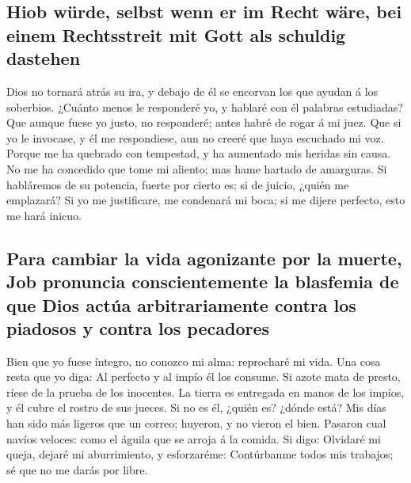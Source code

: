 \hypertarget{hiob-wuxfcrde-selbst-wenn-er-im-recht-wuxe4re-bei-einem-rechtsstreit-mit-gott-als-schuldig-dastehen}{%
\subsection{Hiob würde, selbst wenn er im Recht wäre, bei einem
Rechtsstreit mit Gott als schuldig
dastehen}\label{hiob-wuxfcrde-selbst-wenn-er-im-recht-wuxe4re-bei-einem-rechtsstreit-mit-gott-als-schuldig-dastehen}}

 Dios no tornará atrás su ira, y debajo de él se encorvan
los que ayudan á los soberbios.  ¿Cuánto menos le
responderé yo, y hablaré con él palabras estudiadas?  Que
aunque fuese yo justo, no responderé; antes habré de rogar á mi juez.
 Que si yo le invocase, y él me respondiese, aun no
creeré que haya escuchado mi voz.  Porque me ha quebrado
con tempestad, y ha aumentado mis heridas sin causa.  No
me ha concedido que tome mi aliento; mas hame hartado de amarguras.
 Si habláremos de su potencia, fuerte por cierto es; si
de juicio, ¿quién me emplazará?  Si yo me justificare, me
condenará mi boca; si me dijere perfecto, esto me hará inicuo.

\hypertarget{para-cambiar-la-vida-agonizante-por-la-muerte-job-pronuncia-conscientemente-la-blasfemia-de-que-dios-actuxfaa-arbitrariamente-contra-los-piadosos-y-contra-los-pecadores}{%
\subsection{Para cambiar la vida agonizante por la muerte, Job pronuncia
conscientemente la blasfemia de que Dios actúa arbitrariamente contra
los piadosos y contra los
pecadores}\label{para-cambiar-la-vida-agonizante-por-la-muerte-job-pronuncia-conscientemente-la-blasfemia-de-que-dios-actuxfaa-arbitrariamente-contra-los-piadosos-y-contra-los-pecadores}}

 Bien que yo fuese íntegro, no conozco mi alma:
reprocharé mi vida.  Una cosa resta que yo diga: Al
perfecto y al impío él los consume.  Si azote mata de
presto, ríese de la prueba de los inocentes.  La tierra
es entregada en manos de los impíos, y él cubre el rostro de sus jueces.
Si no es él, ¿quién es? ¿dónde está?  Mis días han sido
más ligeros que un correo; huyeron, y no vieron el bien. 
Pasaron cual navíos veloces: como el águila que se arroja á la comida.
 Si digo: Olvidaré mi queja, dejaré mi aburrimiento, y
esforzaréme:  Contúrbanme todos mis trabajos; sé que no
me darás por libre.

